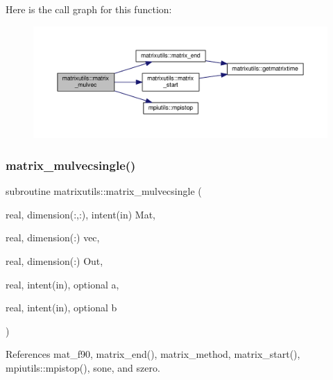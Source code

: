 Here is the call graph for this function\+:
\nopagebreak
\begin{figure}[H]
\begin{center}
\leavevmode
\includegraphics[width=350pt]{namespacematrixutils_a7192e418b9f0d6699a80da809931fed0_cgraph}
\end{center}
\end{figure}
\mbox{\label{namespacematrixutils_a629395ae3092616dd7db4d401570ccd0}} 
\subsubsection{\texorpdfstring{matrix\+\_\+mulvecsingle()}{matrix\_mulvecsingle()}}
{\footnotesize\ttfamily subroutine matrixutils\+::matrix\+\_\+mulvecsingle (\begin{DoxyParamCaption}\item[{real, dimension(\+:,\+:), intent(in)}]{Mat,  }\item[{real, dimension(\+:)}]{vec,  }\item[{real, dimension(\+:)}]{Out,  }\item[{real, intent(in), optional}]{a,  }\item[{real, intent(in), optional}]{b }\end{DoxyParamCaption})}



References mat\+\_\+f90, matrix\+\_\+end(), matrix\+\_\+method, matrix\+\_\+start(), mpiutils\+::mpistop(), sone, and szero.

